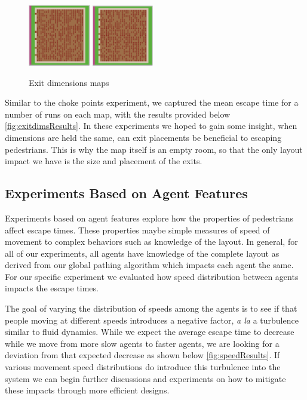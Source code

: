 \documentclass[12pt,letterpaper]{article}
\begin{document}
\begin{figure}[!ht]
\begin{minipage}[b]{.75\linewidth}
    \includegraphics[width=0.24\textwidth]{./figures/exit_dims_6_c.png}
    \includegraphics[width=0.24\textwidth]{./figures/exit_dims_8_c.png}
  \end{minipage}

  \caption{Exit dimensions maps}
\end{figure}

Similar to the choke points experiment, we captured the mean escape time for a number of runs on each map, with the results provided below \ref{fig:exitdimsResults}.  In these experiments we hoped to gain some insight, when dimensions are held the same, can exit placements be beneficial to escaping pedestrians.  This is why the map itself is an empty room, so that the only layout impact we have is the size and placement of the exits.

\subsection{Experiments Based on Agent Features} \label{expAgent}

Experiments based on agent features explore how the properties of pedestrians affect escape times.  These properties maybe simple measures of speed of movement to complex behaviors such as knowledge of the layout.  In general, for all of our experiments, all agents have knowledge of the complete layout as derived from our global pathing algorithm which impacts each agent the same.  For our specific experiment we evaluated how speed distribution between agents impacts the escape times.  

The goal of varying the distribution of speeds among the agents is to see if that people moving at different speeds introduces a negative factor, \emph{a la} a turbulence similar to fluid dynamics.  While we expect the average escape time to decrease while we move from more slow agents to faster agents, we are looking for a deviation from that expected decrease as shown below \ref{fig:speedResults}.  If various movement speed distributions do introduce this turbulence into the system we can begin further discussions and experiments on how to mitigate these impacts through more efficient designs.
\end{document}
